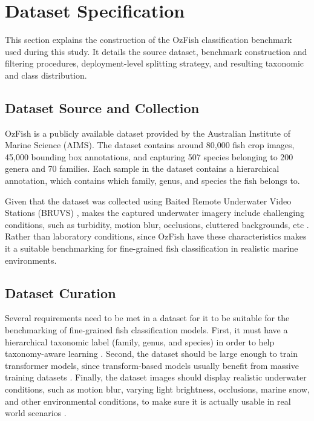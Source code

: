 \documentclass[preprint,12pt]{elsarticle}
\begin{document}
\section{Dataset Specification}\label{dataset-specification}

This section explains the construction of the OzFish classification
benchmark used during this study. It details the source dataset,
benchmark construction and filtering procedures, deployment-level
splitting strategy, and resulting taxonomic and class distribution.

\subsection{\texorpdfstring{Dataset Source and Collection
}{Dataset Source and Collection }}\label{dataset-source-and-collection}

OzFish is a publicly available dataset provided by the Australian
Institute of Marine Science (AIMS)\citep{ref22}.
The dataset contains around 80,000 fish crop images, 45,000 bounding box
annotations, and capturing 507 species belonging to 200 genera and 70
families. Each sample in the dataset contains a hierarchical annotation,
which contains which family, genus, and species the fish belongs to.

Given that the dataset was collected using Baited Remote Underwater
Video Stations (BRUVS) \citep{ref4}, makes the
captured underwater imagery include challenging conditions, such as
turbidity, motion blur, occlusions, cluttered backgrounds, etc
\citep{ref6,ref9}.
Rather than laboratory conditions, since OzFish have these
characteristics makes it a suitable benchmarking for fine-grained fish
classification in realistic marine environments.

\subsection{\texorpdfstring{Dataset Curation
}{Dataset Curation }}\label{dataset-curation}

Several requirements need to be met in a dataset for it to be suitable
for the benchmarking of fine-grained fish classification models. First,
it must have a hierarchical taxonomic label (family, genus, and species)
in order to help taxonomy-aware learning
\citep{ref23,ref24}. Second, the dataset should be
large enough to train transformer models, since transform-based models
usually benefit from massive training datasets
\citep{ref36,ref45}. Finally, the dataset images should
display realistic underwater conditions, such as motion blur, varying
light brightness, occlusions, marine snow, and other environmental
conditions, to make sure it is actually usable in real world scenarios
\citep{ref8,ref9}.
\end{document}

